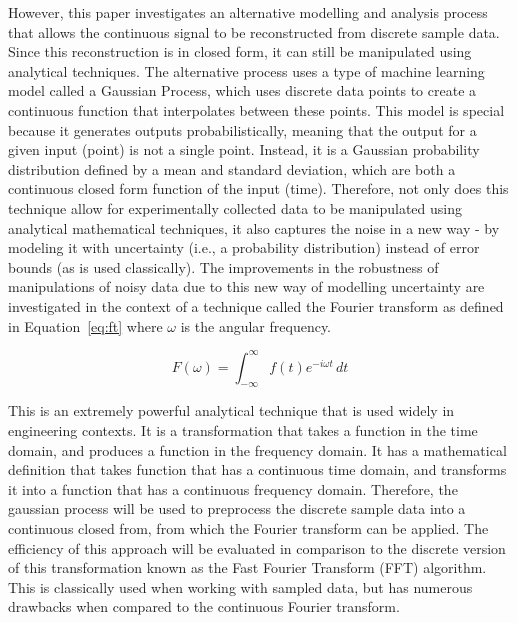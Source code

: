 \documentclass[12pt]{article}
\begin{document}
    However, this paper investigates an alternative modelling and analysis process that allows the continuous signal to be reconstructed from discrete sample data.
    Since this reconstruction is in closed form, it can still be manipulated using analytical techniques.
    The alternative process uses a type of machine learning model called a Gaussian Process, which uses discrete data points to create a continuous function that interpolates between these points.
    This model is special because it generates outputs probabilistically, meaning that the output for a given input (point) is not a single point.
    Instead, it is a Gaussian probability distribution defined by a mean and standard deviation, which are both a continuous closed form function of the input (time).
    Therefore, not only does this technique allow for experimentally collected data to be manipulated using analytical mathematical techniques, it also captures the noise in a new way - by modeling it with uncertainty (i.e., a probability distribution) instead of error bounds (as is used classically).
    The improvements in the robustness of manipulations of noisy data due to this new way of modelling uncertainty are investigated in the context of a technique called the Fourier transform as defined in Equation~\ref{eq:ft} where \( \omega \) is the angular frequency.

    \begin{equation}
        F(\omega) = \int_{-\infty}^{\infty} f(t) e^{-i \omega t} \, dt\label{eq:ft}
    \end{equation}


    This is an extremely powerful analytical technique that is used widely in engineering contexts.
    It is a transformation that takes a function in the time domain, and produces a function in the frequency domain.
    It has a mathematical definition that takes function that has a continuous time domain, and transforms it into a function that has a continuous frequency domain.
    Therefore, the gaussian process will be used to preprocess the discrete sample data into a continuous closed from, from which the Fourier transform can be applied.
    The efficiency of this approach will be evaluated in comparison to the discrete version of this transformation known as the Fast Fourier Transform (FFT) algorithm.
    This is classically used when working with sampled data, but has numerous drawbacks when compared to the continuous Fourier transform.
\end{document}
